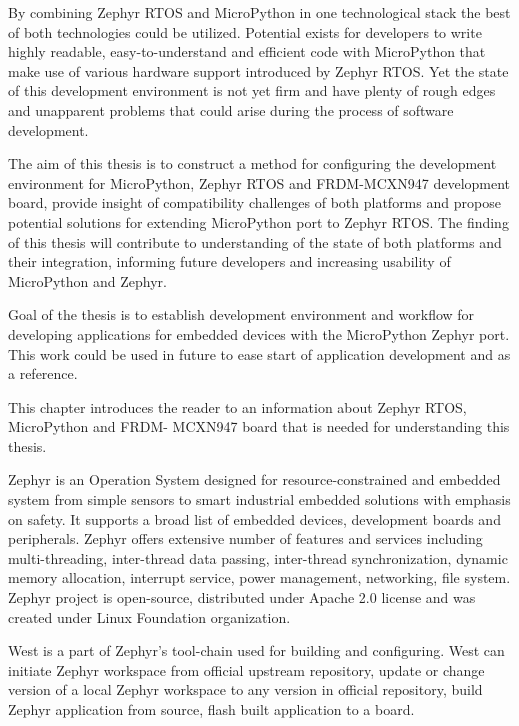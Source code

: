 \documentclass[twoside, 12pt]{article}
\begin{document}
By combining Zephyr RTOS and MicroPython in one technological stack the best of both 
technologies could be utilized. Potential exists for developers to write highly readable,
easy-to-understand and efficient code with MicroPython that make use of various hardware 
support introduced by Zephyr RTOS. Yet the state of this development environment is not yet 
firm and have plenty of rough edges and unapparent problems that could arise during the 
process of software development.

The aim of this thesis is to construct a method for configuring the development environment 
for MicroPython, Zephyr RTOS and FRDM-MCXN947 development board, provide insight of 
compatibility challenges of both platforms and propose potential solutions for extending 
MicroPython port to Zephyr RTOS. The finding of this thesis will contribute to understanding 
of the state of both platforms and their integration, informing future developers and increasing usability of MicroPython and Zephyr.

Goal of the thesis is to establish development environment and workflow for developing 
applications for embedded devices with the MicroPython Zephyr port. This work could be used
in future to ease start of application development and as a reference.

This chapter introduces the reader to an information about Zephyr RTOS, MicroPython and FRDM-
MCXN947 board that is needed for understanding this thesis.

Zephyr is an Operation System designed for resource-constrained and embedded 
system from simple sensors to smart industrial embedded solutions with emphasis on safety. It 
supports a broad list 
of embedded devices, development boards and peripherals. Zephyr offers extensive number of 
features and services including multi-threading, inter-thread data passing, inter-thread 
synchronization, dynamic memory allocation, interrupt service, power management, networking, file system.
Zephyr project is open-source, distributed under Apache 2.0 license and was created under 
Linux Foundation organization.\cite{zephyr1}

\obrazek
{}

West is a part of Zephyr's tool-chain used for building and configuring. West can initiate
Zephyr workspace from official upstream repository, update or change version of a local
Zephyr workspace to any version in official repository, build Zephyr application from source,
flash built application to a board.\cite{zephyr_west}
\end{document}
